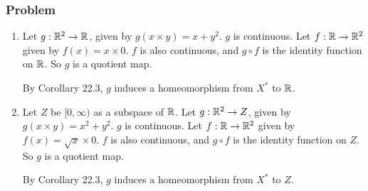 \subsubsection{Problem}
\begin{enumerate}
\item Let $g : \mathbb R^2 \to \mathbb R$, given by $g(x \times y) = x + y^2$. $g$ is continuous. Let $f : \mathbb R \to \mathbb R^2$ given by $f(x) = x \times 0$. $f$ is also continuous, and $g \circ f$ is the identity function on $\mathbb R$. So $g$ is a quotient map.

By Corollary 22.3, $g$ induces a homeomorphism from $X^*$ to $\mathbb R$.

\item Let $Z$ be $[0,\infty)$ as a subspace of $\mathbb R$. Let $g : \mathbb R^2 \to Z$, given by $g(x \times y) = x^2 + y^2$. $g$ is continuous. Let $f : \mathbb R \to \mathbb R^2$ given by $f(x) = \sqrt{x} \times 0$. $f$ is also continuous, and $g \circ f$ is the identity function on $Z$. So $g$ is a quotient map.

By Corollary 22.3, $g$ induces a homeomorphism from $X^*$ to $Z$.
\end{enumerate}
